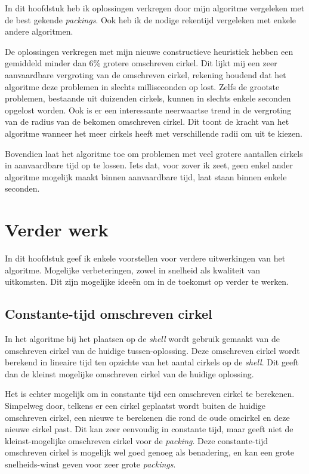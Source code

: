 \documentclass[12pt,a4paper,oneside]{book}
\begin{document}
In dit hoofdstuk heb ik oplossingen verkregen door mijn algoritme vergeleken met de best gekende \textit{packings}.
Ook heb ik de nodige rekentijd vergeleken met enkele andere algoritmen.

De oplossingen verkregen met mijn nieuwe constructieve heuristiek hebben een gemiddeld minder dan 6\% grotere omschreven cirkel.
Dit lijkt mij een zeer aanvaardbare vergroting van de omschreven cirkel, rekening houdend dat het algoritme deze problemen in slechts milliseconden op lost.
Zelfs de grootste problemen, bestaande uit duizenden cirkels, kunnen in slechts enkele seconden opgelost worden.
Ook is er een interessante neerwaartse trend in de vergroting van de radius van de bekomen omschreven cirkel.
Dit toont de kracht van het algoritme wanneer het meer cirkels heeft met verschillende radii om uit te kiezen.

Bovendien laat het algoritme toe om problemen met veel grotere aantallen cirkels in aanvaardbare tijd op te lossen.
Iets dat, voor zover ik zeet, geen enkel ander algoritme mogelijk maakt binnen aanvaardbare tijd, laat staan binnen enkele seconden.

\chapter{Verder werk} \label{chap:verder-werk}

In dit hoofdstuk geef ik enkele voorstellen voor verdere uitwerkingen van het algoritme.
Mogelijke verbeteringen, zowel in snelheid als kwaliteit van uitkomsten.
Dit zijn mogelijke ideeën om in de toekomst op verder te werken.

\section{Constante-tijd omschreven cirkel}

In het algoritme bij het plaatsen op de \textit{shell} wordt gebruik gemaakt van de omschreven cirkel van de huidige tussen-oplossing.
Deze omschreven cirkel wordt berekend in lineaire tijd ten opzichte van het aantal cirkels op de \textit{shell}.
Dit geeft dan de kleinst mogelijke omschreven cirkel van de huidige oplossing.

Het is echter mogelijk om in constante tijd een omschreven cirkel te berekenen.
Simpelweg door, telkens er een cirkel geplaatst wordt buiten de huidige omschreven cirkel, een nieuwe te berekenen die rond de oude omcirkel en deze nieuwe cirkel past.
Dit kan zeer eenvoudig in constante tijd, maar geeft niet de kleinst-mogelijke omschreven cirkel voor de \textit{packing}.
Deze constante-tijd omschreven cirkel is mogelijk wel goed genoeg als benadering, en kan een grote snelheids-winst geven voor zeer grote \textit{packings}.
\end{document}
